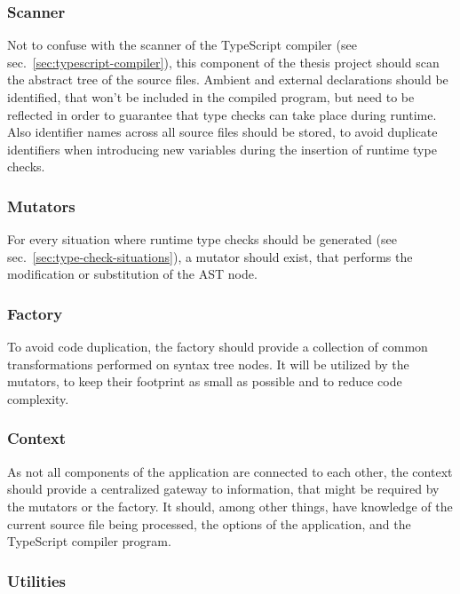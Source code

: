 \subsubsection{Scanner}

Not to confuse with the scanner of the TypeScript compiler (see sec.~\ref{sec:typescript-compiler}), this component of the thesis project should scan the abstract tree of the source files. Ambient and external declarations should be identified, that won't be included in the compiled program, but need to be reflected in order to guarantee that type checks can take place during runtime. Also identifier names across all source files should be stored, to avoid duplicate identifiers when introducing new variables during the insertion of runtime type checks.

\subsubsection{Mutators}

For every situation where runtime type checks should be generated (see sec.~\ref{sec:type-check-situations}), a mutator should exist, that performs the modification or substitution of the AST node.

\subsubsection{Factory}

To avoid code duplication, the factory should provide a collection of common transformations performed on syntax tree nodes. It will be utilized by the mutators, to keep their footprint as small as possible and to reduce code complexity.

\subsubsection{Context}

As not all components of the application are connected to each other, the context should provide a centralized gateway to information, that might be required by the mutators or the factory. It should, among other things, have knowledge of the current source file being processed, the options of the application, and the TypeScript compiler program.

\subsubsection{Utilities}

